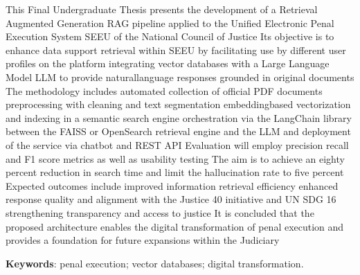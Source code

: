%
%

\begin{ABSTRACT}
\thispagestyle{empty}
\OnehalfSpacing

\noindent This Final Undergraduate Thesis presents the development of a Retrieval Augmented Generation RAG pipeline applied to the Unified Electronic Penal Execution System SEEU of the National Council of Justice Its objective is to enhance data support retrieval within SEEU by facilitating use by different user profiles on the platform integrating vector databases with a Large Language Model LLM to provide naturallanguage responses grounded in original documents The methodology includes automated collection of official PDF documents preprocessing with cleaning and text segmentation embeddingbased vectorization and indexing in a semantic search engine orchestration via the LangChain library between the FAISS or OpenSearch retrieval engine and the LLM and deployment of the service via chatbot and REST API Evaluation will employ precision recall and F1 score metrics as well as usability testing The aim is to achieve an eighty percent reduction in search time and limit the hallucination rate to five percent Expected outcomes include improved information retrieval efficiency enhanced response quality and alignment with the Justice 40 initiative and UN SDG 16 strengthening transparency and access to justice It is concluded that the proposed architecture enables the digital transformation of penal execution and provides a foundation for future expansions within the Judiciary

\SingleSpacing
\noindent \textbf{Keywords}: penal execution; vector databases; digital transformation.

\end{ABSTRACT}
